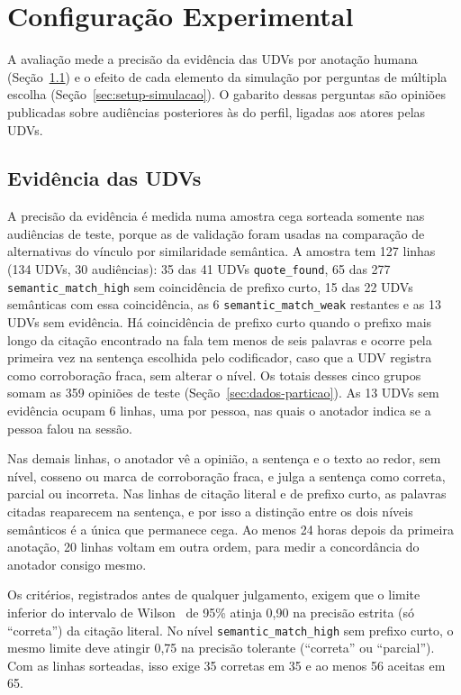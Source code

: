 \section{Configura\c{c}\~ao Experimental}
\label{sec:setup}

A avaliação mede a precisão da evidência das UDVs por anotação humana (Seção~\ref{sec:setup-udv}) e
o efeito de cada elemento da simulação por perguntas de múltipla escolha
(Seção~\ref{sec:setup-simulacao}). O gabarito dessas perguntas são opiniões publicadas sobre
audiências posteriores às do perfil, ligadas aos atores pelas UDVs.

\subsection{Evidência das UDVs}
\label{sec:setup-udv}

A precisão da evidência é medida numa amostra cega sorteada somente nas audiências de teste, porque
as de validação foram usadas na comparação de alternativas do vínculo por similaridade semântica. A
amostra tem 127 linhas (134 UDVs, 30 audiências): 35 das 41 UDVs \texttt{quote\_found}, 65 das 277
\texttt{semantic\_match\_high} sem coincidência de prefixo curto, 15 das 22 UDVs semânticas com essa
coincidência, as 6 \texttt{semantic\_match\_weak} restantes e as 13 UDVs sem evidência. Há
coincidência de prefixo curto quando o prefixo mais longo da citação encontrado na fala tem menos de
seis palavras e ocorre pela primeira vez na sentença escolhida pelo codificador, caso que a UDV
registra como corroboração fraca, sem alterar o nível. Os totais desses cinco grupos somam as 359 opiniões de teste
(Seção~\ref{sec:dados-particao}). As 13 UDVs sem evidência ocupam 6 linhas, uma por pessoa, nas quais
o anotador indica se a pessoa falou na sessão.

Nas demais linhas, o anotador vê a opinião, a sentença e o texto ao redor, sem nível, cosseno ou
marca de corroboração fraca, e julga a sentença como correta, parcial ou incorreta. Nas linhas de
citação literal e de prefixo curto, as palavras citadas reaparecem na sentença, e por isso a
distinção entre os dois níveis semânticos é a única que permanece cega. Ao menos 24 horas depois da
primeira anotação, 20 linhas voltam em outra ordem, para medir a concordância do anotador consigo
mesmo.

Os critérios, registrados antes de qualquer julgamento, exigem que o limite inferior do intervalo de
Wilson~\citep{wilson1927probable} de 95\% atinja 0,90 na precisão estrita (só ``correta'') da citação
literal. No nível \texttt{semantic\_match\_high} sem prefixo curto, o mesmo limite deve atingir 0,75
na precisão tolerante (``correta'' ou ``parcial''). Com as linhas sorteadas, isso exige 35 corretas
em 35 e ao menos 56 aceitas em 65.


